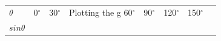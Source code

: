 \begin{center}
\label{m39414*id83562}
\noindent
{}
\tablelasttail{}
\begin{xtabular*}{\mytablewidth}[t]{|p{10\mystarwidth}|p{10\mystarwidth}|p{10\mystarwidth}|p{10\mystarwidth}|p{10\mystarwidth}|p{10\mystarwidth}|p{10\mystarwidth}|p{10\mystarwidth}|}\hline
    $\theta $
    &
0${}^{\circ }$ &
30${}^{\circ }$ &Plotting the g
60${}^{\circ }$ &
90${}^{\circ }$ &
120${}^{\circ }$ &
150${}^{\circ }$ &
\tabularnewline{}
    $sin\theta $
    &
&
&

\end{xtabular*}
\end{center}
